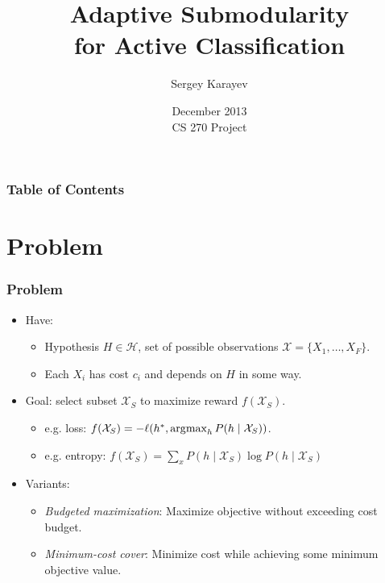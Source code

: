 \documentclass[handout]{beamer}
\begin{document}
\title[Adaptive Submodularity]{Adaptive Submodularity\\for Active Classification}
\author[]{Sergey Karayev}
\date[Dec 2013]{December 2013\\CS 270 Project}
\frame{
    \titlepage
}

\begin{frame}\frametitle{Table of Contents}
\tableofcontents[]
\end{frame}


\section{Problem}

\begin{frame}\frametitle{Problem}
\begin{itemize}
    \item Have:
        \begin{itemize}
            \item Hypothesis $H \in \mathcal{H}$, set of possible observations $\mathcal{X} = \{X_1, \dots, X_F\}$.
            \item Each $X_i$ has cost $c_i$ and depends on $H$ in some way.
        \end{itemize}
    \pause
    \item Goal: select subset $\mathcal{X}_S$ to maximize reward $f(\mathcal{X}_S)$.
    \begin{itemize}
        \item e.g. loss: $f(\mathcal{X}_S) = -\ell(h^*, \operatorname{\arg\!\max}_h P(h \mid \mathcal{X}_S))$.
        \item e.g. entropy: $f(\mathcal{X}_S) = \sum_x P(h \mid \mathcal{X}_S) \log P(h \mid \mathcal{X}_S)$
    \end{itemize}
    \pause
    \item Variants:
    \begin{itemize}
        \item \emph{Budgeted maximization}: Maximize objective without exceeding cost budget.
        \item \emph{Minimum-cost cover}: Minimize cost while achieving some minimum objective value.
    \end{itemize}
\end{itemize}
\end{frame}
\end{document}
